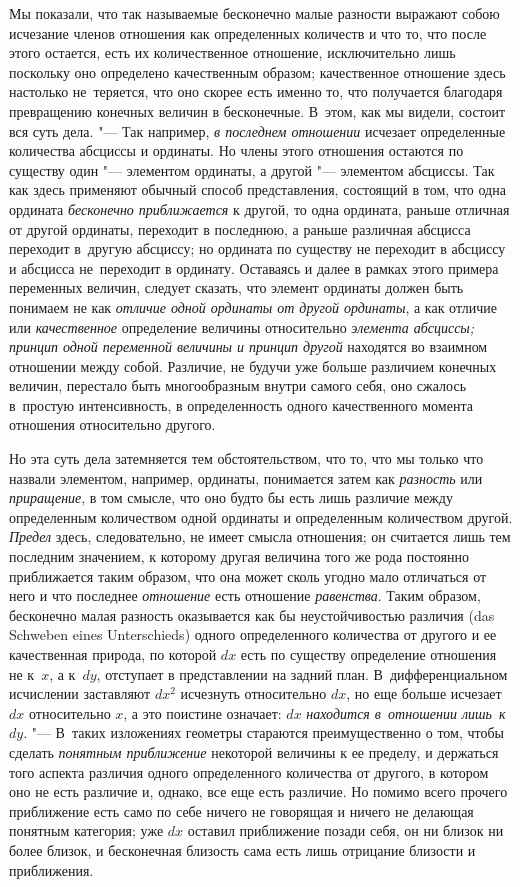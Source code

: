 Мы показали, что так называемые бесконечно малые разности выражают собою
исчезание членов отношения как определенных количеств и что то, что после этого
остается, есть их количественное отношение, исключительно лишь поскольку оно
определено качественным образом; качественное отношение здесь настолько
не~теряется, что оно скорее есть именно то, что получается благодаря
превращению конечных величин в бесконечные. В~этом, как мы видели, состоит вся
суть дела. "--- Так например, {\em в последнем отношении} исчезает определенные
количества абсциссы и ординаты. Но члены этого отношения остаются по существу
один "--- элементом ординаты, а другой "--- элементом абсциссы. Так как здесь
применяют обычный способ представления, состоящий в том, что одна ордината
{\em бесконечно приближается} к другой, то одна ордината, раньше отличная от
другой ординаты, переходит в последнюю, а раньше различная абсцисса переходит
в~другую абсциссу; но ордината по существу не переходит в абсциссу и абсцисса
не~переходит в ординату. Оставаясь и далее в рамках этого примера переменных
величин, следует сказать, что элемент ординаты должен быть понимаем не как
{\em отличие одной ординаты от другой ординаты}, а как отличие или
{\em качественное} определение величины относительно {\em элемента абсциссы;}
{\em принцип одной переменной величины и принцип другой} находятся во взаимном
отношении между собой. Различие, не будучи уже больше различием конечных
величин, перестало быть многообразным внутри самого себя, оно сжалось в~простую
интенсивность, в определенность одного качественного момента отношения
относительно другого.

Но эта суть дела затемняется тем обстоятельством, что то, что мы только что
назвали элементом, например, ординаты, понимается затем как {\em разность} или
{\em приращение}, в том смысле, что оно будто бы есть лишь различие между
определенным количеством одной ординаты и определенным количеством другой.
{\em Предел} здесь, следовательно, не имеет смысла отношения; он считается лишь
тем последним значением, к которому другая величина того же рода постоянно
приближается таким образом, что она может сколь угодно мало отличаться от него
и что последнее {\em отношение} есть отношение {\em равенства}. Таким образом,
бесконечно малая разность оказывается как бы неустойчивостью различия (das
Schweben eines Unterschieds) одного определенного количества от другого и ее
качественная природа, по которой $dx$ есть по существу определение отношения не
к~$x$, а к~$dy$, отступает в представлении на задний план. В~дифференциальном
исчислении заставляют $dx^2$ исчезнуть относительно $dx$, но еще больше
исчезает $dx$ относительно $x$, а это поистине означает: $dx$
{\em находится в~отношении лишь~к}~$dy$. "--- В~таких изложениях геометры
стараются преимущественно о том, чтобы сделать {\em понятным приближение}
некоторой величины к ее пределу, и держаться того аспекта различия одного
определенного количества от другого, в котором оно не есть различие и, однако,
все еще есть различие. Но помимо всего прочего приближение есть само по себе
ничего не говорящая и ничего не делающая понятным категория; уже $dx$ оставил
приближение позади себя, он ни близок ни более близок, и бесконечная близость
сама есть лишь отрицание близости и приближения.

